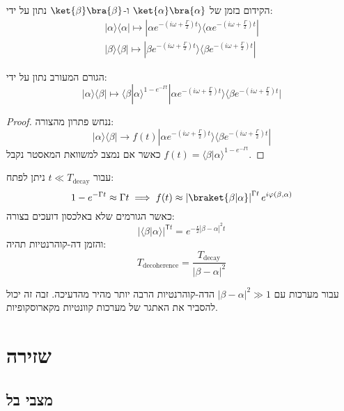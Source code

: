 \documentclass{tstextbook}
\begin{document}
\begin{proposition}
הקידום בזמן של \(\ket{\alpha}\bra{\alpha}\) ו-\(\ket{\beta}\bra{\beta}\) נתון על ידי:
\begin{gather*}|\alpha\rangle\langle\alpha|\mapsto|\alpha e^{-(i\omega+\frac{\Gamma}{2})t}\rangle\langle\alpha e^{-(i\omega+\frac{\Gamma}{2})t}|\\|\beta\rangle\langle\beta|\mapsto|\beta e^{-(i\omega+\frac{\Gamma}{2})t}\rangle\langle\beta e^{-(i\omega+\frac{\Gamma}{2})t}| 
\end{gather*}

\end{proposition}
\begin{proposition}
הגורם המעורב נתון על ידי:
$$|\alpha\rangle\langle\beta|\mapsto \langle\beta|\alpha\rangle^{1-e^{-\Gamma t}}|\alpha e^{-(i\omega+\frac{\Gamma}{2})t}\rangle\langle\beta e^{-(i\omega+\frac{\Gamma}{2})t}|$$

\end{proposition}
\begin{proof}
ננחש פתרון מהצורה:
$$|\alpha\rangle\langle\beta|\to f(t)|\alpha e^{-(i\omega+\frac{\Gamma}{2})t}\rangle\langle\beta e^{-(i\omega+\frac{\Gamma}{2})t}|$$
כאשר אם נמצב למשוואת המאסטר נקבל \(f(t)=\langle\beta|\alpha\rangle^{1-e^{-\Gamma t}}\).

\end{proof}
\begin{corollary}
עבור \(t\ll T_{\mathrm{decay}}\) ניתן לפתח:
$$1-e^{ -\Gamma t }\approx \Gamma t\implies f(t)\approx \left\lvert  \braket{ \beta | \alpha }   \right\rvert ^{\Gamma t}e^{ i\varphi\left( \beta,\alpha \right) }$$
כאשר הגורמים שלא באלכסון דועכים בצורה:
$$|\langle\beta|\alpha\rangle|^{\mathsf{T}t}=e^{-\frac{\mathsf{r}}{2}|\beta-\alpha|^{2}t}$$
והזמן דה-קוהרנטיות תהיה:
$$T_{\mathrm{decoherence}}={\frac{T_{\mathrm{decay}}}{|\beta-\alpha|^{2}}}$$

\end{corollary}
\begin{corollary}
עבור מערכות עם \(\left\lvert  \beta-\alpha  \right\rvert^{2}\gg 1\) הדה-קוהרנטיות הרבה יותר מהיר מהדעיכה. זבה זה יכול להסביר את האתגר של מערכות קוונטיות מקארוסקופיות.

\end{corollary}
\chapter{שזירה}

\section{מצבי בל}
\end{document}
